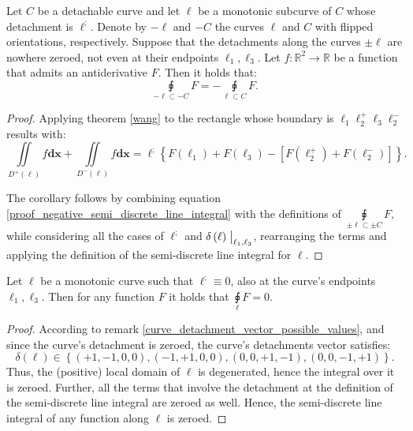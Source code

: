 \documentclass[11pt]{book}
\begin{document}
\begin{corollary}Let $C$ be a detachable curve and let $\ell$ be a monotonic subcurve of $C$ whose detachment is $\ell^;$. Denote by $-\ell$ and $-C$ the curves $\ell$ and $C$ with flipped orientations, respectively.
Suppose that the detachments along the curves $\pm\ell$ are nowhere zeroed, not even at their endpoints $\ell_1,\ell_3$. Let $f:\mathbb{R}^2\rightarrow\mathbb{R}$ be a function that admits an antiderivative $F$. Then it holds that:
$$\underset{-\ell\subset-C}{\sqint}F=-\underset{\ell\subset C}{\sqint}F.$$
\end{corollary}
\begin{proof}Applying theorem \ref{wang} to the rectangle whose boundary is $\ell_1\ell_2^+\ell_3\ell_2^-$ results with:
$$\label{proof_negative_semi_discrete_line_integral}\underset{D^{+}\left(\ell\right)}{\iint}f\boldsymbol{dx}+\underset{D^{-}\left(\ell\right)}{\iint}f\boldsymbol{dx}=\ell^{;}\left\{ F\left(\ell_{1}\right)+F\left(\ell_{3}\right)-\left[F\left(\ell_{2}^{+}\right)+F\left(\ell_{2}^{-}\right)\right]\right\}.$$

The corollary follows by combining equation \ref{proof_negative_semi_discrete_line_integral} with the definitions of $\underset{\pm\ell\subset \pm C}{\sqint}F,$ while considering all the cases of $\ell^;$ and $\delta\left(\ell\right)\bigm\lvert_{\ell_1,\ell_3}$, rearranging the terms and applying the definition of the semi-discrete line integral for $\ell$.
\end{proof}

\begin{corollary}Let $\ell$ be a monotonic curve such that $\ell^;\equiv0$, also at the curve’s endpoints $\ell_1,\ell_3$. Then for any function $F$ it holds that $\underset{\ell}{\sqint}F=0.$
\end{corollary}
\begin{proof}According to remark \ref{curve_detachment_vector_possible_values}, and since the curve’s detachment is zeroed, the curve’s detachments vector satisfies:
$$\delta\left(\ell\right)\in\left\{\left(+1,-1,0,0\right),\left(-1,+1,0,0\right),\left(0,0,+1,-1\right),\left(0,0,-1,+1\right)\right\}.$$
Thus, the (positive) local domain of $\ell$ is degenerated, hence the integral over it is zeroed. Further, all the terms that involve the detachment at the definition of the semi-discrete line integral are zeroed as well. Hence, the semi-discrete line integral of any function along $\ell$ is zeroed.
\end{proof}
\end{document}
